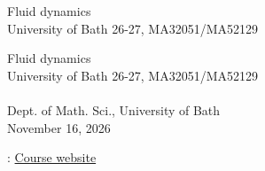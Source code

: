 \documentclass[oneside,10pt,]{book}
\newcommand{\titlepagefont}{\relax}
\numberwithin{equation}{section}
\begin{document}
\raggedbottom
\frontmatter
\thispagestyle{empty}
{\titlepagefont\centering
\vspace*{0.28\textheight}
{\Huge Fluid dynamics}\\[2\baselineskip]
{\LARGE University of Bath 26-27, MA32051\slash{}MA52129}\\
}
\clearpage
\thispagestyle{empty}
{\titlepagefont\centering
\vspace*{0.14\textheight}
{\Huge Fluid dynamics}\\[\baselineskip]
{\LARGE University of Bath 26-27, MA32051\slash{}MA52129}\\[3\baselineskip]
{\Large  }\\[0.5\baselineskip]
{\Large Dept. of Math. Sci., University of Bath}\\[3\baselineskip]
{\Large November 16, 2026}\\}
\clearpage
\thispagestyle{empty}
: \href{https://trinh.github.io/BathMAFluids/}{Course website}\par\medskip
{}
\null\clearpage
%
%
\typeout{************************************************}
\typeout{************************************************}
%
\end{document}
